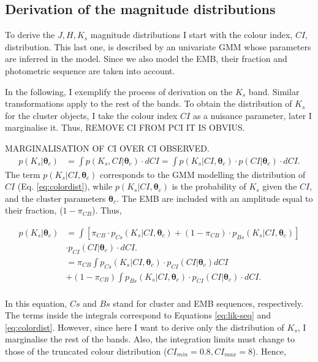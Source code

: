 \subsection{Derivation of the magnitude distributions}
\label{subsect:deriveluminosity}
To derive the $J,H,K_s$ magnitude distributions I start with the colour index, $CI$, distribution. This last one, is described by an univariate GMM whose parameters are inferred in the model. Since we also model the EMB, their fraction and photometric sequence are taken into account. 

In the following, I exemplify the process of derivation on the $K_s$ band. Similar transformations apply to the rest of the bands. 
To obtain the distribution of $K_s$ for the cluster objects, I take the colour index $CI$ as a nuisance parameter, later I marginalise it. Thus, 
REMOVE CI FROM PCI IT IS OBVIUS.

MARGINALISATION OF CI OVER CI OBSERVED.
\begin{align}
p(K_s | \boldsymbol{\theta}_c) & = \int p(K_s,CI | \boldsymbol{\theta}_c) \cdot dCI =  \int p(K_s | CI ,\boldsymbol{\theta}_c) \cdot p(CI|\boldsymbol{\theta}_c)\cdot dCI. \nonumber
\end{align}
The term $p(K_s | CI ,\boldsymbol{\theta}_c)$ corresponds to the GMM modelling the distribution of $CI$ (Eq. \ref{eq:colordist}), while $p(K_s | CI ,\boldsymbol{\theta}_c)$ is the probability of $K_s$ given the $CI$, and the cluster parameters $\boldsymbol{\theta}_c$. The EMB are included with an amplitude equal to their fraction, ($1-\pi_{CB}$). Thus,

\begin{align}
p(K_s | \boldsymbol{\theta}_c) & =  \int \left[\pi_{CB}\cdot p_{Cs}(K_s| CI, \boldsymbol{\theta}_c) + (1-\pi_{CB})\cdot p_{Bs}(K_s| CI, \boldsymbol{\theta}_c)\right]\nonumber \\& \cdot p_{CI}(CI|\boldsymbol{\theta}_c)\cdot dCI. \nonumber \\
& =   \pi_{CB} \int p_{Cs}(K_s| CI, \boldsymbol{\theta}_c) \cdot p_{CI}(CI|\boldsymbol{\theta}_c) dCI \nonumber \\
&+ (1-\pi_{CB})\int p_{Bs}(K_s| CI, \boldsymbol{\theta}_c) \cdot p_{CI}(CI|\boldsymbol{\theta}_c)\cdot  dCI. \nonumber \\
\end{align}

In this equation, $Cs$ and $Bs$ stand for cluster and EMB sequences, respectively. The terms inside the integrals correspond to Equations \ref{eq:lik-seq} and \ref{eq:colordist}. However, since here I want to derive only the distribution of $K_s$, I marginalise the rest of the bands. Also, the integration limits must change to those of the truncated colour distribution ($CI_{min}=0.8, CI_{max}=8$). Hence,

